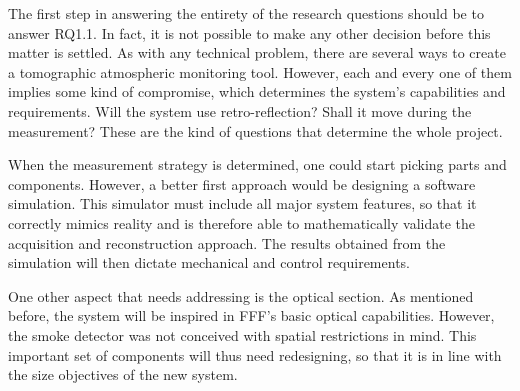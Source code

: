 The first step in answering the entirety of the research questions
should be to answer RQ1.1. In fact, it is not possible to make any other
decision before this matter is settled. As with any technical problem,
there are several ways to create a tomographic atmospheric monitoring
tool. However, each and every one of them implies some kind of
compromise, which determines the system's capabilities and requirements.
Will the system use retro-reflection? Shall it move during the
measurement? These are the kind of questions that determine the whole
project.

When the measurement strategy is determined, one could start picking
parts and components. However, a better first approach would be
designing a software simulation. This simulator must include all major
system features, so that it correctly mimics reality and is therefore
able to mathematically validate the acquisition and reconstruction
approach. The results obtained from the simulation will then dictate
mechanical and control requirements.

One other aspect that needs addressing is the optical section. As
mentioned before, the system will be inspired in \gls{FFF}'s basic
optical capabilities. However, the smoke detector was not conceived with
spatial restrictions in mind. This important set of components will thus
need redesigning, so that it is in line with the size objectives of the
new system.
